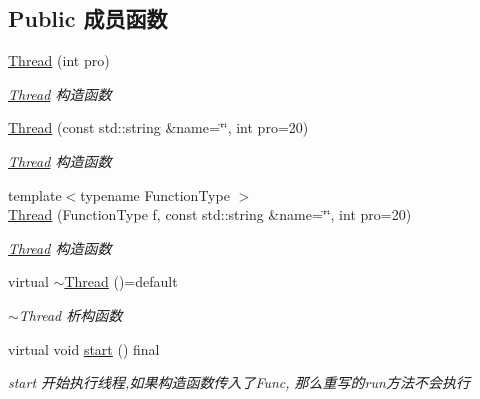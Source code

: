 \subsection*{Public 成员函数}
\begin{DoxyCompactItemize}
\item 
\hyperlink{classThread_a66350772ff3af06962db113658a72ae3}{Thread} (int pro)
\begin{DoxyCompactList}\small\item\em \hyperlink{classThread}{Thread} 构造函数 \end{DoxyCompactList}\item 
\hyperlink{classThread_a038819a1ef7bb4e50ae580d477f1a3b0}{Thread} (const std\+::string \&name=\char`\"{}\char`\"{}, int pro=20)
\begin{DoxyCompactList}\small\item\em \hyperlink{classThread}{Thread} 构造函数 \end{DoxyCompactList}\item 
{\footnotesize template$<$typename Function\+Type $>$ }\\\hyperlink{classThread_a61efca5f0beb62628c515fb7cdef7e08}{Thread} (Function\+Type f, const std\+::string \&name=\char`\"{}\char`\"{}, int pro=20)
\begin{DoxyCompactList}\small\item\em \hyperlink{classThread}{Thread} 构造函数 \end{DoxyCompactList}\item 
\mbox{\label{classThread_a957c601b090d6c2798c3cceb4ae5dc0f}} 
virtual \hyperlink{classThread_a957c601b090d6c2798c3cceb4ae5dc0f}{$\sim$\+Thread} ()=default
\begin{DoxyCompactList}\small\item\em $\sim$\+Thread 析构函数 \end{DoxyCompactList}\item 
\mbox{\label{classThread_a3a36451e02a15180624cdd88212cb1ba}} 
virtual void \hyperlink{classThread_a3a36451e02a15180624cdd88212cb1ba}{start} () final
\begin{DoxyCompactList}\small\item\em start 开始执行线程,如果构造函数传入了\+Func, 那么重写的run方法不会执行 \end{DoxyCompactList}\item 
\mbox{\label{classThread_a07b23d8d75300651cba3eb79652c77fd}} 

\end{DoxyCompactItemize}
